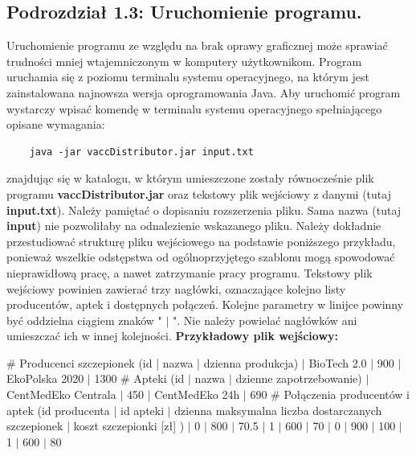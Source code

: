 \documentclass[a4paper]{article}
\newcommand\tab[1][1cm]{\hspace*{#1}}
\begin{document}
\subsection*{Podrozdział 1.3: Uruchomienie programu.}
\tab Uruchomienie programu ze względu na brak oprawy graficznej może sprawiać trudności mniej wtajemniczonym w komputery użytkownikom. Program uruchamia się z poziomu terminalu systemu operacyjnego, na którym jest zainstalowana najnowsza wersja oprogramowania Java. Aby uruchomić program wystarczy wpisać komendę w terminalu systemu operacyjnego spełniającego opisane wymagania:
\begin{lstlisting}
	java -jar vaccDistributor.jar input.txt
\end{lstlisting}
znajdując się w katalogu, w którym umieszczone zostały równocześnie plik programu \textbf{vaccDistributor.jar} oraz tekstowy plik wejściowy z danymi (tutaj \textbf{input.txt}). Należy pamiętać o dopisaniu rozszerzenia pliku. Sama nazwa (tutaj \textbf{input}) nie pozwoliłaby na odnalezienie wskazanego pliku. \newline \newline
\tab Należy dokładnie przestudiować strukturę pliku wejściowego na podstawie poniższego przykładu, ponieważ wszelkie odstępstwa od ogólnoprzyjętego szablonu mogą spowodować nieprawidłową pracę, a nawet zatrzymanie pracy programu. Tekstowy plik wejściowy powinien zawierać trzy nagłówki, oznaczające kolejno listy producentów, aptek i dostępnych połączeń. Kolejne parametry w linijce powinny być oddzielna ciągiem znaków " $|$ ". Nie należy powielać nagłówków ani umieszczać ich w innej kolejności.
\newline
\newline \textbf{Przykładowy plik wejściowy:}
\begin{tcolorbox}
\# Producenci szczepionek (id | nazwa | dzienna produkcja)
 $|$ BioTech 2.0 $|$ 900
 $|$ EkoPolska 2020 $|$ 1300
\newline \# Apteki (id $|$ nazwa $|$ dzienne zapotrzebowanie)
 $|$ CentMedEko Centrala $|$ 450 
 $|$ CentMedEko 24h $|$ 690 
\newline \# Połączenia producentów i aptek (id producenta $|$ id apteki $|$ dzienna maksymalna liczba dostarczanych szczepionek $|$ koszt szczepionki [zł] )
 $|$ 0 $|$ 800 $|$ 70.5 
 $|$ 1 $|$ 600 $|$ 70 
 $|$ 0 $|$ 900 $|$ 100 
 $|$ 1 $|$ 600 $|$ 80
\end{tcolorbox}
\newpage
\end{document}
